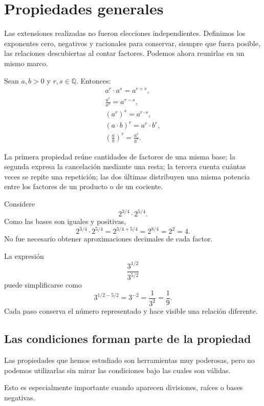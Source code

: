 \section{Propiedades generales}

Las extensiones realizadas no fueron elecciones independientes. Definimos los exponentes cero, negativos y racionales para conservar, siempre que fuera posible, las relaciones descubiertas al contar factores. Podemos ahora reunirlas en un mismo marco.

Sean \(a,b>0\) y \(r,s\in\mathbb Q\). Entonces:
\begin{gather*}
a^r\cdot a^s=a^{r+s},\\
\frac{a^r}{a^s}=a^{r-s},\\
(a^r)^s=a^{r\cdot s},\\
(a\cdot b)^r=a^r\cdot b^r,\\
\left(\frac ab\right)^r=\frac{a^r}{b^r}.
\end{gather*}

La primera propiedad reúne cantidades de factores de una misma base; la segunda expresa la cancelación mediante una resta; la tercera cuenta cuántas veces se repite una repetición; las dos últimas distribuyen una misma potencia entre los factores de un producto o de un cociente.

\begin{example}
Considere
\[
2^{3/4}\cdot2^{5/4}.
\]
Como las bases son iguales y positivas,
\[
2^{3/4}\cdot2^{5/4}
=
2^{3/4+5/4}
=
2^{8/4}
=
2^2
=
4.
\]
No fue necesario obtener aproximaciones decimales de cada factor.
\end{example}

\begin{example}
La expresión
\[
\frac{3^{1/2}}{3^{5/2}}
\]
puede simplificarse como
\[
3^{1/2-5/2}=3^{-2}=\frac1{3^2}=\frac19.
\]
Cada paso conserva el número representado y hace visible una relación diferente.
\end{example}

\subsection{Las condiciones forman parte de la propiedad}

Las propiedades que hemos estudiado son herramientas muy poderosas, pero no podemos utilizarlas sin mirar las condiciones bajo las cuales son válidas.

Esto es especialmente importante cuando aparecen divisiones, raíces o bases negativas.

